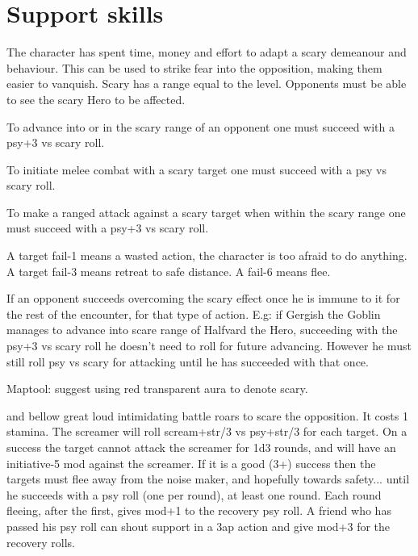 
\section*{Support skills}

\openskillslist


 The character has spent time, money and effort to adapt a scary demeanour and behaviour. This can be used to strike fear into the opposition, making them easier to vanquish. Scary has a range equal to the level. Opponents must be able to see the scary Hero to be affected.

To advance into or in the scary range of an opponent one must succeed with a psy+3 vs scary roll.

To initiate melee combat with a scary target one must succeed with a psy vs scary roll.

To make a ranged attack against a scary target when within the scary range one must succeed with a psy+3 vs scary roll.

A target fail-1 means a wasted action, the character is too afraid to do anything. A target fail-3 means retreat to safe distance. A fail-6 means flee.

If an opponent succeeds overcoming the scary effect once he is immune to it for the rest of the encounter, for that type of action. E.g: if Gergish the Goblin manages to advance into scare range of Halfvard the Hero, succeeding with the psy+3 vs scary roll he doesn't need to roll for future advancing. However he must still roll psy vs scary for attacking until he has succeeded with that once.

Maptool: suggest using red transparent aura to denote scary.


 and bellow great loud intimidating battle roars to scare the opposition. It costs 1 stamina. The screamer will roll scream+str/3 vs psy+str/3 for each target. On a success the target cannot attack the screamer for 1d3 rounds, and will have an initiative-5 mod against the screamer. If it is a good (3+) success then the targets must flee away from the noise maker, and hopefully towards safety... until he succeeds with a psy roll (one per round), at least one round. Each round fleeing, after the first, gives mod+1 to the recovery psy roll. A friend who has passed his psy roll can shout support in a 3ap action and give mod+3 for the recovery rolls.

